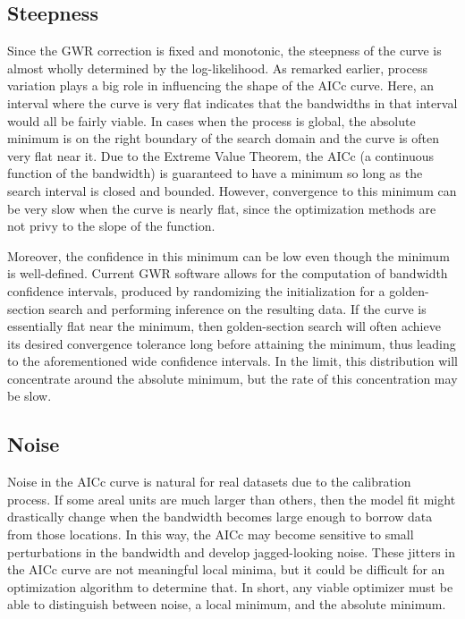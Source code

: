 \documentclass[letterpaper,12pt,twocolumn]{article}
\begin{document}
\subsection{Steepness}
Since the GWR correction is fixed and monotonic, the steepness of the curve is almost wholly determined by the log-likelihood. As remarked earlier, process variation plays a big role in influencing the shape of the AICc curve. Here, an interval where the curve is very flat indicates that the bandwidths in that interval would all be fairly viable. In cases when the process is global, the absolute minimum is on the right boundary of the search domain and the curve is often very flat near it. Due to the Extreme Value Theorem, the AICc (a continuous function of the bandwidth) is guaranteed to have a minimum so long as the search interval is closed and bounded. However, convergence to this minimum can be very slow when the curve is nearly flat, since the optimization methods are not privy to the slope of the function.

Moreover, the confidence in this minimum can be low even though the minimum is well-defined. Current GWR software allows for the computation of bandwidth confidence intervals, produced by randomizing the initialization for a golden-section search and performing inference on the resulting data. If the curve is essentially flat near the minimum, then golden-section search will often achieve its desired convergence tolerance long before attaining the minimum, thus leading to the aforementioned wide confidence intervals. In the limit, this distribution will concentrate around the absolute minimum, but the rate of this concentration may be slow. 

\subsection{Noise}
\label{sec:problem-noise}
Noise in the AICc curve is natural for real datasets due to the calibration process. If some areal units are much larger than others, then the model fit might drastically change when the bandwidth becomes large enough to borrow data from those locations. In this way, the AICc may become sensitive to small perturbations in the bandwidth and develop jagged-looking noise. These jitters in the AICc curve are not meaningful local minima, but it could be difficult for an optimization algorithm to determine that. In short, any viable optimizer must be able to distinguish between noise, a local minimum, and the absolute minimum.
\end{document}
